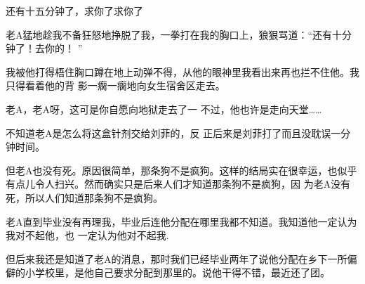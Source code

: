 \documentclass{article}
\begin{document}
还有十五分钟了，求你了求你了 


老A猛地趁我不备狂怒地挣脱了我，一拳打在我的胸口上，狼狠骂道：“还有十分钟了！去你的！
” 

我被他打得梧住胸口蹲在地上动弹不得，从他的眼神里我看出来再也拦不住他。我只得看着他的背
影一瘸一瘸地向女生宿舍区走去。 

老A，老A呀，这可是你自愿向地狱走去了一
不过，他也许是走向天堂…… 

\newpage

不知道老A是怎么将这盒针剂交给刘菲的，反
正后来是刘菲打了而且没耽误一分钟时间。 

但老A也没有死。原因很简单，那条狗不是疯狗。这样的结局实在很幸运，也似乎有点儿令人扫兴。然而确实只是后来人们才知道那条狗不是疯狗，因
为老A没有死，所以人们知道那条狗不是疯狗。 

老A直到毕业没有再理我，毕业后连他分配在哪里我都不知道。我知道他一定认为我对不起他，也
一定认为他对不起我. 

但后来我还是知道了老A的消息，那时我们已经毕业两年了说他分配在乡下一所偏僻的小学校里，是他自己要求分配到那里的。说他干得不错，最近还了团。
\end{document}
